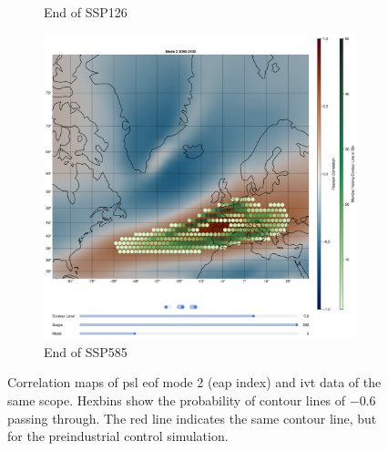 \begin{figure}[!htb]
\begin{subfigure}[b]{0.49\textwidth}
    \caption{End of SSP126} 
    \label{fig:psl eof ivt cor ssp126 mode2}
  \end{subfigure}
  \begin{subfigure}[b]{0.49\textwidth}
    \includegraphics[width=\textwidth]{figures/psl_ivt_cor_mode2_ssp585.png}
    \caption{End of SSP585}
    \label{fig:psl eof ivt cor ssp585 mode2}
  \end{subfigure}
  \caption[Correlation Maps of PSL EOF Mode 2 and IVT Data]{Correlation maps of \ac{psl} \ac{eof} mode 2 (\ac{eap} index) and \ac{ivt} data of the same scope. Hexbins show the probability of contour lines of $-0.6$ passing through. The red line indicates the same contour line, but for the preindustrial control simulation.}
  \label{fig:psl eof ivt cor mode2}
\end{figure}



